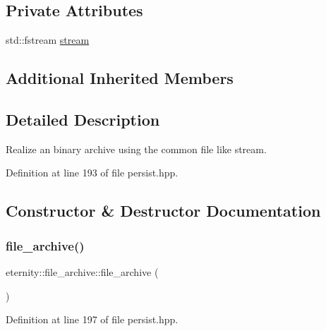 \subsection*{Private Attributes}
\begin{DoxyCompactItemize}
\item 
std\+::fstream \hyperlink{classeternity_1_1file__archive_ac702d57d9633f8695476da8a7d55dd9d}{stream}
\end{DoxyCompactItemize}
\subsection*{Additional Inherited Members}


\subsection{Detailed Description}
Realize an binary archive using the common file like stream. 

Definition at line 193 of file persist.\+hpp.



\subsection{Constructor \& Destructor Documentation}
\mbox{\label{classeternity_1_1file__archive_ab2a892aad41300e922115115b76b7754}} 
\subsubsection{\texorpdfstring{file\+\_\+archive()}{file\_archive()}\hspace{0.1cm}{\footnotesize\ttfamily [1/2]}}
{\footnotesize\ttfamily eternity\+::file\+\_\+archive\+::file\+\_\+archive (\begin{DoxyParamCaption}{ }\end{DoxyParamCaption})\hspace{0.3cm}{\ttfamily [inline]}}



Definition at line 197 of file persist.\+hpp.

\mbox{\label{classeternity_1_1file__archive_a6f7dd96ce65d0be588f31286313a4b5a}} 

